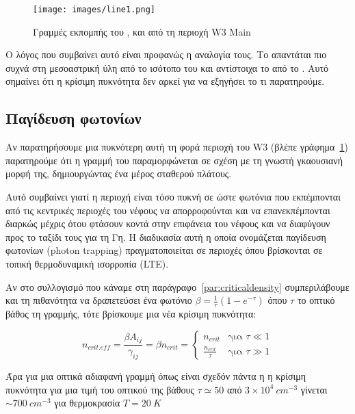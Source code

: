 \documentclass[a4paper,12pt]{memoir}
\newcommand{\e}[1]{\times 10^{#1}}
\begin{document}
\begin{figure}[h]
	\label{fig:line1}
	\centering
	\texttt{[image: images/line1.png]}
	\caption{Γραμμές εκπομπής του ,  και  από τη περιοχή W3 Main}
\end{figure}

Ο λόγος που συμβαίνει αυτό είναι προφανώς η αναλογία τους. Το  απαντάται πιο συχνά στη μεσοαστρική ύλη από το ισότοπο του  και αντίστοιχα το  από το . Αυτό σημαίνει ότι η κρίσιμη πυκνότητα δεν αρκεί για να εξηγήσει το τι παρατηρούμε.

\subsection{Παγίδευση φωτονίων}
Αν παρατηρήσουμε μια πυκνότερη αυτή τη φορά περιοχή του W3 (βλέπε γράφημα~\ref{fig:line1}) παρατηρούμε ότι η γραμμή του  παραμορφώνεται σε σχέση με τη γνωστή γκαουσιανή μορφή της, δημιουργώντας ένα μέρος σταθερού πλάτους. 

Αυτό συμβαίνει γιατί η περιοχή είναι τόσο πυκνή σε  ώστε φωτόνια που εκπέμπονται από τις κεντρικές περιοχές του νέφους να απορροφούνται και να επανεκπέμπονται διαρκώς μέχρις ότου φτάσουν κοντά στην επιφάνεια του νέφους και να διαφύγουν προς το ταξίδι τους για τη Γη. Η διαδικασία αυτή η οποία ονομάζεται παγίδευση φωτονίων (photon trapping) πραγματοποιείται σε περιοχές όπου βρίσκονται σε τοπική θερμοδυναμική ισορροπία (LTE).

Αν στο συλλογισμό που κάναμε στη παράγραφο~\ref{par:criticaldensity} συμπεριλάβουμε και τη πιθανότητα να δραπετεύσει ένα φωτόνιο $\beta = \frac{1}{\tau} (1-e^{-\tau})$ \cite{goldreich_1974} όπου $\tau$ το οπτικό βάθος τη γραμμής, τότε βρίσκουμε μια νέα κρίσιμη πυκνότητα:

\begin{equation}
n_{crit.eff}=\frac{\beta A_{ij}}{\gamma _{ij}}=\beta n_{crit} = 
\begin{cases}
 n_{crit} & \text{για } \tau \ll 1\\
\frac{n_{crit}}{\tau} & \text{για } \tau \gg 1
\end{cases}
\end{equation}

Άρα για μια οπτικά αδιαφανή γραμμή όπως είναι σχεδόν πάντα η  η κρίσιμη πυκνότητα για μια τιμή του οπτικού της βάθους $\tau \simeq 50$ από $3\e{4}\ cm^{-3}$ γίνεται $\sim 700\ cm^{-3}$ για θερμοκρασία $T=20\ K$ 
\end{document}

